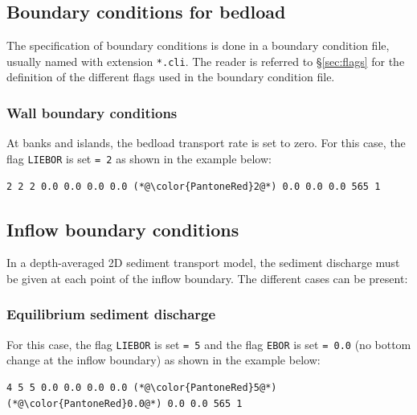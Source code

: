 \begin{itemize}
\end{itemize}

\subsection{Boundary conditions for bedload}
The specification of boundary conditions is done in a boundary condition file, usually named with extension \texttt{*.cli}. The reader is referred to \S\ref{sec:flags} for the definition of the different flags used in the boundary condition file.

\subsubsection{Wall boundary conditions}
At banks and islands, the bedload transport rate is set to zero. For this case, the flag \texttt{LIEBOR} is set \texttt{= 2} as shown in the example below:

\begin{lstlisting}[frame=trBL]
2 2 2 0.0 0.0 0.0 0.0 (*@\color{PantoneRed}2@*) 0.0 0.0 0.0 565 1
\end{lstlisting}

\subsection{Inflow boundary conditions}
In a depth-averaged 2D sediment transport model, the sediment discharge must be given at each point of the inflow boundary. The different cases can be present:
\subsubsection{Equilibrium sediment discharge}
For this case, the flag \texttt{LIEBOR} is set \texttt{= 5} and the flag \texttt{EBOR} is set \texttt{= 0.0} (no bottom change at the inflow boundary) as shown in the example below:

\begin{lstlisting}[frame=trBL]
4 5 5 0.0 0.0 0.0 0.0 (*@\color{PantoneRed}5@*) (*@\color{PantoneRed}0.0@*) 0.0 0.0 565 1
\end{lstlisting}

